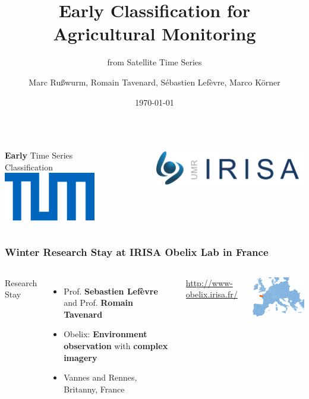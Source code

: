 \documentclass[%
  aspectratio=169,
  9pt,
  USenglish,
  titlegraphic, %
  progressbar,
]{beamer}
\title{Early Classification for Agricultural Monitoring}
\subtitle{from Satellite Time Series}
\author[M. Rußwurm, R. Tavenard, S. Lefèvre, M.Körner]{Marc Rußwurm, Romain Tavenard, Sébastien Lefèvre, Marco Körner}
\institute[TUM, IRISA-Obelix, LETG-Rennes]{Technical University of Munich, Germany\\
                Remote Sensing Technology}
\date{\today}
\begin{document}
\begin{frame}[t]
  \titlepage
\end{frame}



{
	\begin{frame}[plain]
	\vfill
	\Huge\color{tumbluedark}
	\begin{columns}
		\vspace{4em}
		
		\hfill \textbf{Early} Time Series \\\hfill Classification
		\includegraphics[width=4cm]{images/TUM-blue}
		
		\vspace{1em}
		\includegraphics[width=7cm]{images/Irisa}
	\end{columns}
	
	\vfill
\end{frame}
}


\begin{frame}
\frametitle{Winter Research Stay at IRISA Obelix Lab in France}

\begin{columns}

Research Stay
\begin{itemize}[itemsep=1em]
	\item Prof. \textbf{Sebastien Lefèvre} and Prof. \textbf{Romain Tavenard}
	\item Obelix: \textbf{Environment observation} with \textbf{complex imagery}
	\item Vannes and Rennes, Britanny, France
\end{itemize}

\vspace{1em}
\url{http://www-obelix.irisa.fr/}


\includegraphics[width=5cm]{images/map/europe}

\end{columns}

\end{frame}
\end{document}
